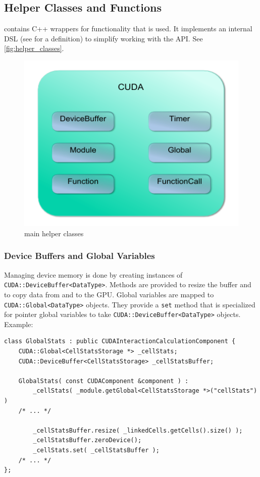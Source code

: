 \subsection{\cuda{} Helper Classes and Functions}
 contains C++ wrappers for \cuda{} functionality that is used.
It implements an internal DSL (see \cite{fowlerDSL} for a definition) to simplify working with the \cuda{} API. See \autoref{fig:helper_classes}.

\begin{figure}
\includegraphics{figures/helpers_classes.pdf}
\centering
\caption{main \cuda{} helper classes}
\label{fig:helper_classes}
\end{figure}

\subsubsection{Device Buffers and Global Variables}
Managing device memory is done by creating instances of \lstinline!CUDA::DeviceBuffer<DataType>!. Methods are provided to resize the buffer and to copy data from and to the GPU.
Global variables are mapped to \lstinline!CUDA::Global<DataType>! objects. They provide a \lstinline!set! method that is specialized for pointer global variables to take \lstinline!CUDA::DeviceBuffer<DataType>! objects.
Example:
\begin{lstlisting}[label=cudamemoryhelpers,caption=\cuda{} helper classes for device memory and globals]
class GlobalStats : public CUDAInteractionCalculationComponent {
	CUDA::Global<CellStatsStorage *> _cellStats;
	CUDA::DeviceBuffer<CellStatsStorage> _cellStatsBuffer;
	
	GlobalStats( const CUDAComponent &component ) :
		_cellStats( _module.getGlobal<CellStatsStorage *>("cellStats") )
	/* ... */
	
		_cellStatsBuffer.resize( _linkedCells.getCells().size() );
		_cellStatsBuffer.zeroDevice();
		_cellStats.set( _cellStatsBuffer );		
	/* ... */		
};	
\end{lstlisting}

